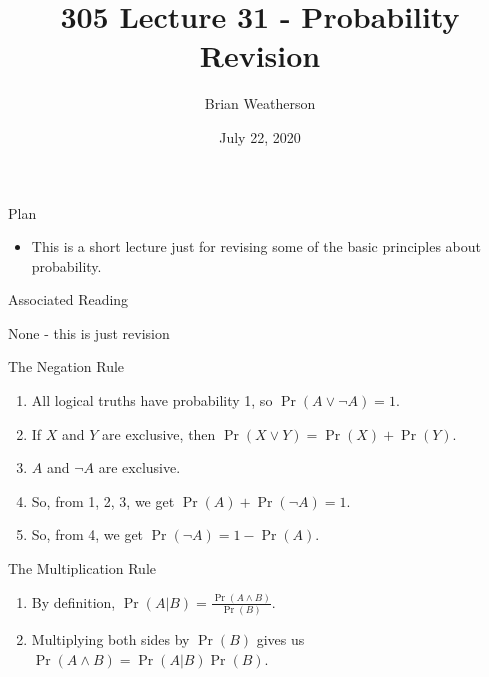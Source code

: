 \documentclass[
  ignorenonframetext,
]{beamer}
\title{305 Lecture 31 - Probability Revision}
\author{Brian Weatherson}
\date{July 22, 2020}
\providecommand{\tightlist}{%
  \setlength{\itemsep}{0pt}\setlength{\parskip}{0pt}}
\renewcommand{\,}{\text{, }}
\begin{document}
\frame{\titlepage}

\begin{frame}{Plan}
\protect\hypertarget{plan}{}

\begin{itemize}
\tightlist
\item
  This is a short lecture just for revising some of the basic principles
  about probability.
\end{itemize}

\end{frame}

\begin{frame}{Associated Reading}
\protect\hypertarget{associated-reading}{}

None - this is just revision

\end{frame}

\begin{frame}{The Negation Rule}
\protect\hypertarget{the-negation-rule}{}

\begin{enumerate}
\tightlist
\item
  All logical truths have probability 1, so \(\Pr(A \vee \neg A) = 1\).
  \pause
\item
  If \(X\) and \(Y\) are exclusive, then
  \(\Pr(X \vee Y) = \Pr(X) + \Pr(Y)\). \pause
\item
  \(A\) and \(\neg A\) are exclusive. \pause
\item
  So, from 1, 2, 3, we get \(\Pr(A) + \Pr(\neg A) = 1\). \pause
\item
  So, from 4, we get \(\Pr(\neg A) = 1 - \Pr(A)\).
\end{enumerate}

\end{frame}

\begin{frame}{The Multiplication Rule}
\protect\hypertarget{the-multiplication-rule}{}

\begin{enumerate}
\tightlist
\item
  By definition, \(\Pr(A | B) = \frac{\Pr(A \wedge B)}{\Pr(B)}\). \pause
\item
  Multiplying both sides by \(\Pr(B)\) gives us
  \(\Pr(A \wedge B) = \Pr(A | B)\Pr(B)\).
\end{enumerate}

\end{frame}
\end{document}
